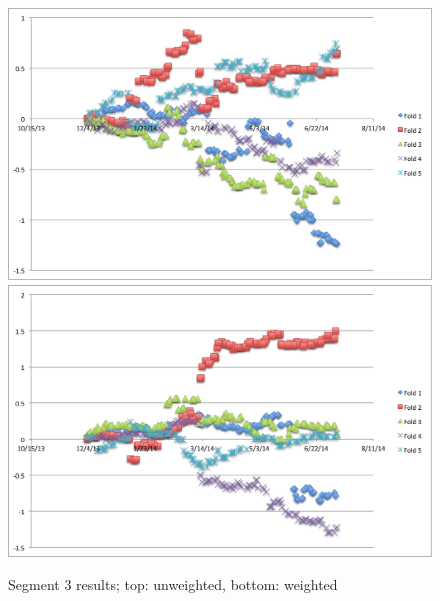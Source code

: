 \documentclass[11pt,letterpaper]{article}
\begin{document}
\begin{itemize}
\begin{figure}
	\includegraphics[width=14cm]{images/unweighted-exp-2.png}
    	\qquad
    	\includegraphics[width=14cm]{images/weighted-exp-2.png}
    	\caption{Segment 3 results; top: unweighted, bottom: weighted}%
    	\label{fig:3}
\end{figure}


\end{itemize}
\end{document}
